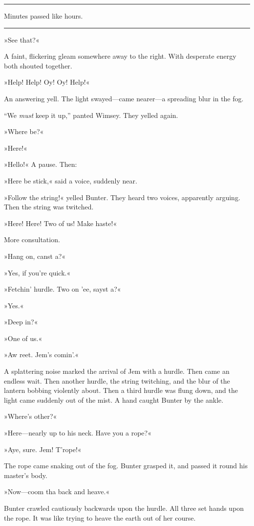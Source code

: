 \noindent\hfil\rule{0.5\textwidth}{.4pt}\hfil 

Minutes passed like hours. 

\noindent\hfil\rule{0.5\textwidth}{.4pt}\hfil 

»See that?«

A faint, flickering gleam somewhere away to the right. With desperate energy both shouted together.

»Help! Help! Oy! Oy! Help!«

An answering yell. The light swayed—came nearer—a spreading blur in the fog.

\enquote{We \textit{must} keep it up,} panted Wimsey. They yelled again.

»Where be?«

»Here!«

»Hello!« A pause. Then:

»Here be stick,« said a voice, suddenly near.

»Follow the string!« yelled Bunter. They heard two voices, apparently arguing. Then the string was twitched.

»Here! Here! Two of us! Make haste!«

More consultation.

»Hang on, canst a?«

»Yes, if you're quick.«

»Fetchin' hurdle. Two on 'ee, sayst a?«

»Yes.«

»Deep in?«

»One of us.«

»Aw reet. Jem's comin'.«

A splattering noise marked the arrival of Jem with a hurdle. Then came an endless wait. Then another hurdle, the string twitching, and the blur of the lantern bobbing violently about. Then a third hurdle was flung down, and the light came suddenly out of the mist. A hand caught Bunter by the ankle.

»Where's other?«

»Here—nearly up to his neck. Have you a rope?«

»Aye, sure. Jem! T'rope!«

The rope came snaking out of the fog. Bunter grasped it, and passed it round his master's body.

»Now—coom tha back and heave.«

Bunter crawled cautiously backwards upon the hurdle. All three set hands upon the rope. It was like trying to heave the earth out of her course.

